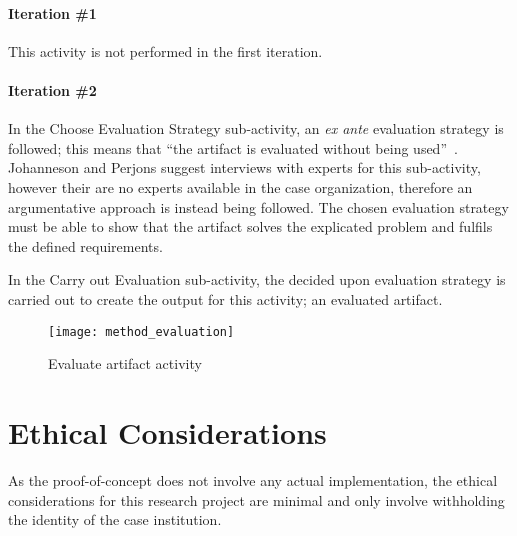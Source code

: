 \paragraph{Iteration \#1}

This activity is not performed in the first iteration. 

\paragraph{Iteration \#2}

In the Choose Evaluation Strategy sub-activity, an \textit{ex ante} evaluation strategy is followed; this means that ``the artifact is evaluated without being used''~\cite[Ch. 9.1]{johannessonPerjons2012}. Johanneson and Perjons suggest interviews with experts for this sub-activity, however their are no experts available in the case organization, therefore an argumentative approach is instead being followed. The chosen evaluation strategy must be able to show that the artifact solves the explicated problem and fulfils the defined requirements.

In the Carry out Evaluation sub-activity, the decided upon evaluation strategy is carried out to create the output for this activity; an evaluated artifact. 

\begin{figure}
\texttt{[image: method\_evaluation]}
\caption{Evaluate artifact activity}
\label{fig:method_eval}
\end{figure}

\section{Ethical Considerations}

As the proof-of-concept does not involve any actual implementation, the ethical considerations for this research project are minimal and only involve withholding the identity of the case institution. 

